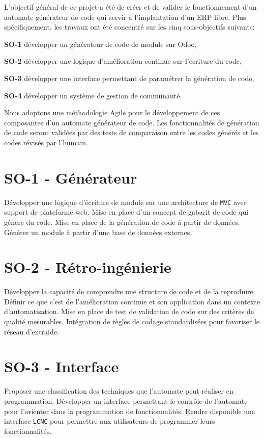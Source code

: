 \label{sec:Theme1} \label{chapitre_methode}

L’objectif général de ce projet a été de créer et de valider le fonctionnement d’un automate générateur de code qui servir à l’implantation d’un ERP libre. Plus spécifiquement, les travaux ont été concentré sur les cinq sous-objectifs suivants:

\textbf{SO-1} développer un générateur de code de module sur Odoo,

\textbf{SO-2} développer une logique d'amélioration continue sur l'écriture du code,

\textbf{SO-3} développer une interface permettant de paramétrer la génération de code,

\textbf{SO-4} développer un système de gestion de communauté.

Nous adoptons une méthodologie Agile pour le développement de ces composantes d'un automate générateur de code. Les fonctionnalités de génération de code seront validées par des tests de comparaison entre les codes générés et les codes révisés par l’humain.

\section{SO-1 - Générateur}
Développer une logique d’écriture de module sur une architecture de \texttt{MVC} avec support de plateforme web. Mise en place d’un concept de gabarit de code qui génère du code. Mise en place de la génération de code à partir de données. Générer un module à partir d’une base de données externes.

\section{SO-2 - Rétro-ingénierie}
Développer la capacité de comprendre une structure de code et de la reproduire. Définir ce que c’est de l’amélioration continue et son application dans un contexte d’automatisation. Mise en place de test de validation de code sur des critères de qualité mesurables. Intégration de règles de codage standardisées pour favoriser le réseau d’entraide.

\section{SO-3 - Interface}
Proposer une classification des techniques que l’automate peut réaliser en programmation. Développer un interface permettant le contrôle de l’automate pour l’orienter dans la programmation de fonctionnalités. Rendre disponible une interface \texttt{LCNC} pour permettre aux utilisateurs de programmer leurs fonctionnalités.

